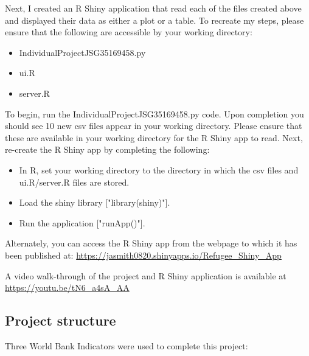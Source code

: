 \documentclass{article}
\begin{document}
\noindent
Next, I created an R Shiny application that read each of the files created above and displayed their data as either a plot or a table.
To recreate my steps, please ensure that the following are accessible by your working directory:

\begin{itemize}
\item Individual\textunderscore Project\textunderscore JSG35169458.py

\item ui.R

\item server.R
\end{itemize}

\noindent To begin, run the Individual\textunderscore Project\textunderscore JSG35169458.py code. Upon completion you should see 10 new csv files appear in your working directory. Please ensure that these are available in your working directory for the R Shiny app to read.
Next, re-create the R Shiny app by completing the following:

\begin{itemize}
\item In R, set your working directory to the directory in which the csv files and ui.R/server.R files are stored.

\item Load the shiny library ["library(shiny)"].

\item Run the application ["runApp()"].
\end{itemize}

\noindent Alternately, you can access the R Shiny app from the webpage to which it has been published at: \url{https://jasmith0820.shinyapps.io/Refugee_Shiny_App}\vspace{2mm}

\noindent A video walk-through of the project and R Shiny application is available at \url{https://youtu.be/tN6_a4sA_AA}

\subsection{Project structure}

\noindent Three World Bank Indicators were used to complete this project:
\end{document}
